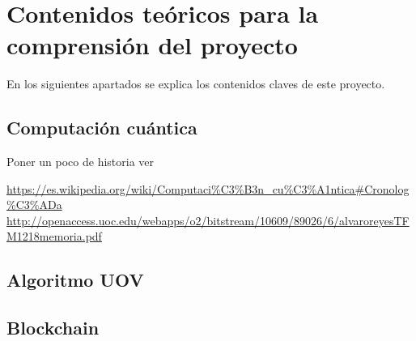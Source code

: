 \section{Contenidos teóricos para la comprensión del proyecto}

En los siguientes apartados se explica los contenidos claves de este proyecto.

\subsection{Computación cuántica}
Poner un poco de historia ver 

\url{https://es.wikipedia.org/wiki/Computaci%C3%B3n_cu%C3%A1ntica#Cronolog%C3%ADa}
\url{http://openaccess.uoc.edu/webapps/o2/bitstream/10609/89026/6/alvaroreyesTFM1218memoria.pdf}
\subsection{Algoritmo UOV}

\subsection{Blockchain}




